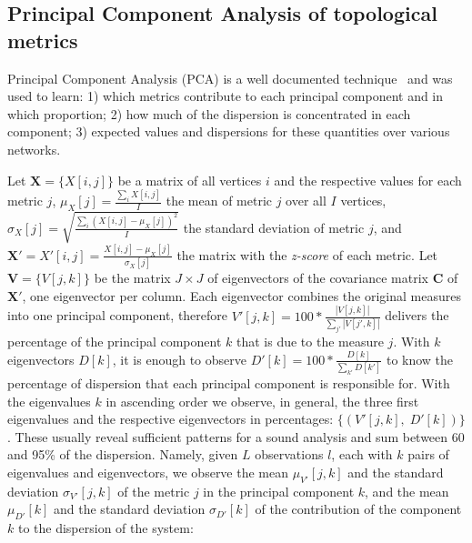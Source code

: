 \documentclass[%
	aip,
	jmp,%
	amsmath,amssymb,
	reprint,%
]{revtex4-1}
\begin{document}

\subsection{Principal Component Analysis of topological metrics}\label{sec:pca}
Principal Component Analysis (PCA) is a well documented technique~\cite{pca} and was used to learn: 1) which metrics contribute to each principal component and in which proportion; 2) how much of the dispersion is concentrated in each component; 3) expected values and dispersions for these quantities over various networks.

Let $\mathbf{X}=\{X[i,j]\}$ be a matrix of all vertices $i$ and the respective
values for each metric $j$, 
$\mu_X [j]=\frac{\sum_i X[i,j]}{I}$ the mean of metric $j$ over all $I$ vertices, 
$\sigma_X [j]=\sqrt{\frac{\sum_i (X[i,j]-\mu_X [j])^2}{I}}$ the standard deviation of metric $j$,
and $\mathbf{X'}=X'[i,j]={\frac{X[i,j]-\mu_X[j]}{\sigma_X[j]}}$ 
the matrix with the \emph{z-score} of each metric. 
Let $\mathbf{V}=\{V[j,k]\}$ be the matrix $J\times J$ of eigenvectors
of the covariance matrix $\mathbf{C}$
of $\mathbf{X'}$, one eigenvector per column.
Each eigenvector combines the original measures into one principal component, therefore
$V'[j,k]=100*\frac{|V[j,k]|}{\sum_{j'} |V[j',k]|}$
delivers the percentage of the principal component $k$
that is due to the measure $j$.
With $k$ eigenvectors 
$D[k]$,
it is enough to observe $D'[k]=100*\frac{D[k]}{\sum_{k'}D[k']}$
to know the percentage of dispersion that each principal component
is responsible for.
With the eigenvalues $k$ in ascending order
we observe, in general, the three first eigenvalues and
the respective eigenvectors in percentages:
$\{(V'[j,k],\;D'[k])\}$.
These usually reveal sufficient patterns for a sound analysis and sum between 60 and 95\% of the dispersion.
Namely, given $L$ observations $l$, each with $k$ pairs of
eigenvalues and eigenvectors, we observe
the mean
$\mu_{V'}[j,k]$
and the standard deviation $\sigma_{V'}[j,k]$ 
of the metric $j$ in the principal component $k$,
and the mean
$\mu_{D'}[k]$
and the standard deviation 
$\sigma_{D'}[k]$
of the contribution of the component $k$ to the dispersion
of the system:
\end{document}
